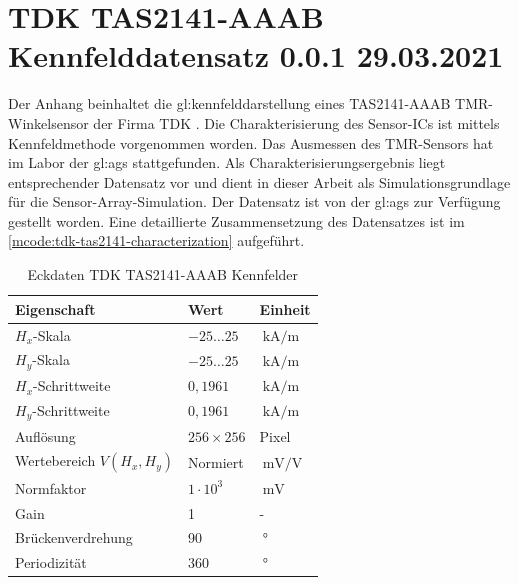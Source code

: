 %

\chapter{TDK TAS2141-AAAB Kennfelddatensatz 0.0.1 29.03.2021}\label{ch:tdk-datensatz}

Der Anhang beinhaltet die \gls{gl:kennfeld}darstellung eines TAS2141-AAAB TMR-Winkelsensor der Firma TDK \cite{TDK2016}. Die Charakterisierung des Sensor-ICs ist mittels Kennfeldmethode \cite{Schuethe2019} vorgenommen worden. Das Ausmessen des TMR-Sensors hat im Labor der \gls{gl:ags} stattgefunden. Als Charakterisierungsergebnis liegt entsprechender Datensatz vor und dient in dieser Arbeit als Simulationsgrundlage für die Sensor-Array-Simulation. Der Datensatz ist von der \gls{gl:ags} zur Verfügung gestellt worden. Eine detaillierte Zusammensetzung des Datensatzes ist im \autoref{mcode:tdk-tas2141-characterization} aufgeführt.


\vspace{5mm}
\begin{table}[!htbp]
	\centering
	\begin{tabular}{l l l}
		\toprule
		\textbf{Eigenschaft}      & \textbf{Wert}    & \textbf{Einheit}                \\ \midrule
		$H_x$-Skala               & $-25 \ldots 25$  & $\SI{}{\kilo\ampere\per\metre}$ \\
		$H_y$-Skala               & $-25 \ldots 25$  & $\SI{}{\kilo\ampere\per\metre}$ \\ \hline
		$H_x$-Schrittweite        & $0,1961$         & $\SI{}{\kilo\ampere\per\metre}$ \\
		$H_y$-Schrittweite        & $0,1961$         & $\SI{}{\kilo\ampere\per\metre}$ \\ \hline
		Auflösung                 & $256 \times 256$ & Pixel                           \\
		Wertebereich $V(H_x,H_y)$ & Normiert         & $\SI{}{\milli\volt\per\volt}$   \\ \hline
		Normfaktor                & $1\cdot 10^3$    & $\SI{}{\milli\volt}$            \\
		Gain                      & 1                & -                               \\ \hline
		Brückenverdrehung         & 90               & $\SI{}{\degree}$                \\
		Periodizität              & 360              & $\SI{}{\degree}$                \\ \bottomrule
	\end{tabular}%
	\caption[Eckdaten TDK TAS2141-AAAB Kennfelder]{Eckdaten TDK TAS2141-AAAB Kennfelder}
\label{tab:tdk-char-data}
\end{table}


